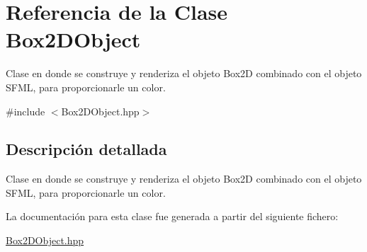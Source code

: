 \hypertarget{class_box2_d_object}{}\section{Referencia de la Clase Box2\+D\+Object}
\label{class_box2_d_object}


Clase en donde se construye y renderiza el objeto Box2D combinado con el objeto S\+F\+ML, para proporcionarle un color.  




{\ttfamily \#include $<$Box2\+D\+Object.\+hpp$>$}



\subsection{Descripción detallada}
Clase en donde se construye y renderiza el objeto Box2D combinado con el objeto S\+F\+ML, para proporcionarle un color. 

La documentación para esta clase fue generada a partir del siguiente fichero\+:\begin{DoxyCompactItemize}
\item 
\mbox{\hyperlink{_box2_d_object_8hpp}{Box2\+D\+Object.\+hpp}}\end{DoxyCompactItemize}
